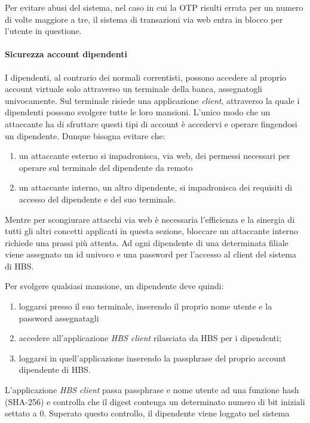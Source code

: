 Per evitare abusi del sistema, nel caso in cui la OTP risulti errata per un numero di volte maggiore a tre, il sistema di transazioni via web entra in blocco per l'utente in questione.






\paragraph{Sicurezza account dipendenti}
I dipendenti, al contrario dei normali correntisti, possono accedere al proprio account virtuale solo attraverso un terminale della banca, assegnatogli univocamente. Sul terminale risiede una applicazione \emph{client}, attraverso la quale i dipendenti possono svolgere tutte le loro mansioni. L'unico modo che un attaccante ha di sfruttare questi tipi di account è accedervi e operare fingendosi un dipendente. Dunque bisogna evitare che:
\begin{enumerate}
\item un attaccante esterno si impadronisca, via web, dei permessi necessari per operare sul terminale del dipendente da remoto
\item un attaccante interno, un altro dipendente, si impadronisca dei requisiti di accesso del dipendente e del suo terminale.
\end{enumerate}

Mentre per scongiurare attacchi via web è necessaria l'efficienza e la sinergia di tutti gli altri concetti applicati in questa sezione, bloccare un attaccante interno richiede una prassi più attenta.
Ad ogni dipendente di una determinata filiale viene assegnato un id univoco e una password per l'accesso al client del sistema di HBS.


Per svolgere qualsiasi mansione, un dipendente deve quindi:
\begin{enumerate}
\item loggarsi presso il suo terminale, inserendo il proprio nome utente e la password assegnatagli
\item accedere all'applicazione \emph{HBS client} rilasciata da HBS per i dipendenti;
\item loggarsi in quell'applicazione inserendo la passphrase del proprio account dipendente di HBS.
\end{enumerate}
L'applicazione \emph{HBS client} passa passphrase e nome utente ad una funzione hash (SHA-256) e controlla che il digest contenga un determinato numero di bit iniziali settato a 0. Superato questo controllo, il dipendente viene loggato nel sistema

